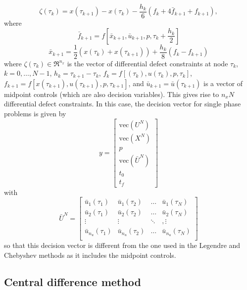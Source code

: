 \documentclass[a4paper,11pt]{report}    %
\begin{document}
\begin{equation}
\label{eq:HS}
   \zeta(\tau_k) = x(\tau_{k+1}) - x(\tau_k) - \frac{h_k}{6}( f_k + 4 \bar f_{k+1} + f_{k+1}), 
\end{equation}
where
\[
  \bar f_{k+1} = f[ \bar x_{k+1}, \bar u_{k+1}, p, \tau_k + \frac{h_k}{2} ]
\]
\[
  \bar x_{k+1}  = \frac{1}{2}( x(\tau_k) + x(\tau_{k+1}) ) + \frac{h_k}{8}( f_k - f_{k+1} )
\]
where $\zeta(\tau_k) \in \Re^{n_x}$ is the vector of differential defect constraints at node $\tau_k$, 
 $k=0,\ldots, N-1$, $h_k=\tau_{k+1}-\tau_k$,  
$f_k = f[(\tau_k), u(\tau_k), p, \tau_k]$, $f_{k+1} = f[x(\tau_{k+1}), u(\tau_{k+1}), p, \tau_{k+1}]$, 
and $\bar u_{k+1} = \bar u(\tau_{k+1})$
is a vector of midpoint controls (which are also decision variables).
This gives rise to $n_x N$ differential defect constraints. In this case, the decision vector for single
phase problems is given by
\begin{equation} \label{HS_single_phase_dv}
   y = \begin{bmatrix}
          \mathrm{vec}(U^N) \\
          \mathrm{vec}(X^N) \\
          p        \\
          \mathrm{vec}(\bar U^N) \\
          t_0      \\
          t_f     
       \end{bmatrix}
\end{equation}
with
\begin{equation}
   \bar U^N = \begin{bmatrix} 
           \bar u_1(\tau_1)& \bar u_1(\tau_2)& \ldots& \bar u_{1}(\tau_N) \\
           \bar u_2(\tau_1)& \bar u_2(\tau_2)& \ldots& \bar u_{2}(\tau_N) \\
           \vdots &   \vdots &  \ddots&, \vdots \\
           \bar u_{n_u}(\tau_1)& \bar u_{n_u}(\tau_2)& \ldots& \bar u_{n_u}(\tau_N) \\
         \end{bmatrix}
\end{equation}
so that this decision vector is different from the one used in the Legendre and Chebyshev methods as it
includes the midpoint controls.

\subsection{Central difference method}
\end{document}
